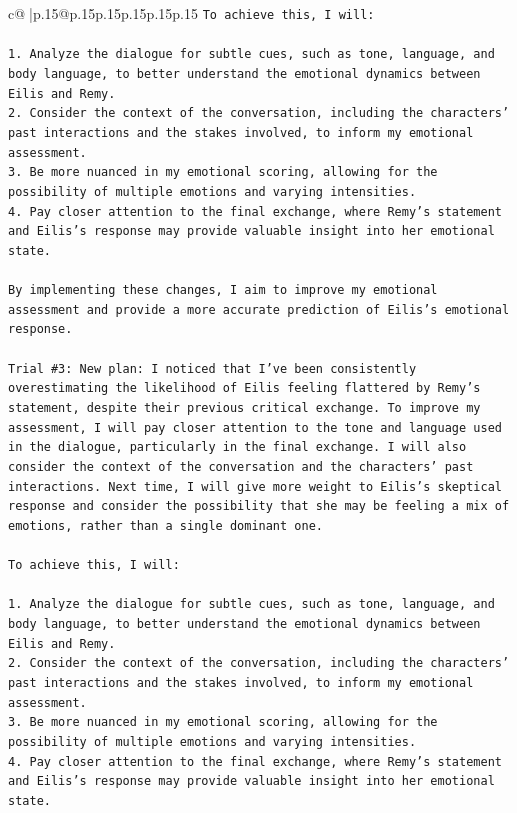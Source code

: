 \documentclass{article}
\begin{document}
{\begin{supertabular}{c@{$\;$}|p{.15\linewidth}@{}p{.15\linewidth}p{.15\linewidth}p{.15\linewidth}p{.15\linewidth}p{.15\linewidth}}
{{{\texttt{To achieve this, I will:} \\
\\ 
\texttt{1. Analyze the dialogue for subtle cues, such as tone, language, and body language, to better understand the emotional dynamics between Eilis and Remy.} \\
\texttt{2. Consider the context of the conversation, including the characters' past interactions and the stakes involved, to inform my emotional assessment.} \\
\texttt{3. Be more nuanced in my emotional scoring, allowing for the possibility of multiple emotions and varying intensities.} \\
\texttt{4. Pay closer attention to the final exchange, where Remy's statement and Eilis's response may provide valuable insight into her emotional state.} \\
\\ 
\texttt{By implementing these changes, I aim to improve my emotional assessment and provide a more accurate prediction of Eilis's emotional response.} \\
\\ 
\texttt{Trial \#3: New plan: I noticed that I've been consistently overestimating the likelihood of Eilis feeling flattered by Remy's statement, despite their previous critical exchange. To improve my assessment, I will pay closer attention to the tone and language used in the dialogue, particularly in the final exchange. I will also consider the context of the conversation and the characters' past interactions. Next time, I will give more weight to Eilis's skeptical response and consider the possibility that she may be feeling a mix of emotions, rather than a single dominant one.} \\
\\ 
\texttt{To achieve this, I will:} \\
\\ 
\texttt{1. Analyze the dialogue for subtle cues, such as tone, language, and body language, to better understand the emotional dynamics between Eilis and Remy.} \\
\texttt{2. Consider the context of the conversation, including the characters' past interactions and the stakes involved, to inform my emotional assessment.} \\
\texttt{3. Be more nuanced in my emotional scoring, allowing for the possibility of multiple emotions and varying intensities.} \\
\texttt{4. Pay closer attention to the final exchange, where Remy's statement and Eilis's response may provide valuable insight into her emotional state.} \\
}}}
\end{supertabular}}
\end{document}
